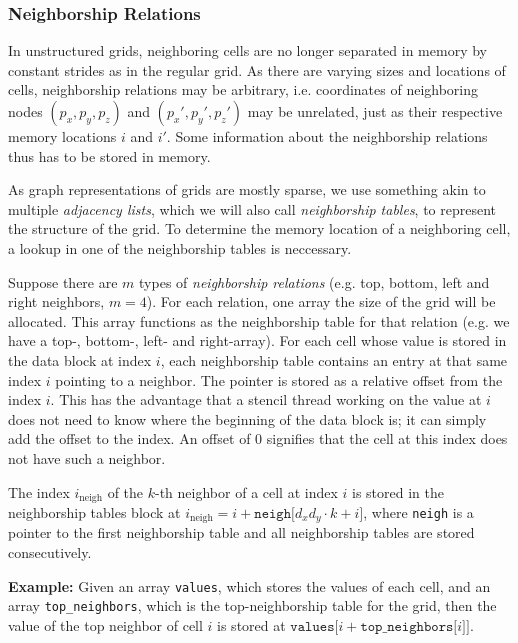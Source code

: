 \subsubsection{Neighborship Relations}

In unstructured grids, neighboring cells are no longer separated in memory by  constant strides as in the regular grid. As there are varying sizes and locations of cells, neighborship relations may be arbitrary, i.e. coordinates of neighboring nodes $(p_x, p_y, p_z)$ and $(p_x', p_y', p_z')$ may be unrelated, just as their respective memory locations $i$ and $i'$. Some information about the neighborship relations thus has to be stored in memory.

As graph representations of grids are mostly sparse, we use something akin to multiple \emph{adjacency lists}\cite[Chapter 12]{DSA}, which we will also call \emph{neighborship tables}, to represent the structure of the grid. To determine the memory location of a neighboring cell, a lookup in one of the neighborship tables is neccessary.

Suppose there are $m$ types of \emph{neighborship relations} (e.g. top, bottom, left and right neighbors, $m=4$). For each relation, one array the size of the grid will be allocated. This array functions as the neighborship table for that relation (e.g. we have a top-, bottom-, left- and right-array). For each cell whose value is stored in the data block at index $i$, each neighborship table contains an entry at that same index $i$ pointing to a neighbor. The pointer is stored as a relative offset from the index $i$. This has the advantage that a stencil thread working on the value at $i$ does not need to know where the beginning of the data block is; it can simply add the offset to the index. An offset of $0$ signifies that the cell at this index does not have such a neighbor.

The index $i_\text{neigh}$ of the $k$-th neighbor of a cell at index $i$ is stored in the neighborship tables block at $i_\text{neigh} = i + \mathtt{neigh[}d_xd_y\cdot k + i\mathtt{]}$, where \texttt{neigh} is a pointer to the first neighborship table and all neighborship tables are stored consecutively.

\textbf{Example:} Given an array \texttt{values}, which stores the values of each cell, and an array \texttt{top\_neighbors}, which is the top-neighborship table for the grid, then the value of the top neighbor of cell $i$ is stored at $\mathtt{values[}i + \mathtt{top\_neighbors[}i\mathtt{]]}$.


